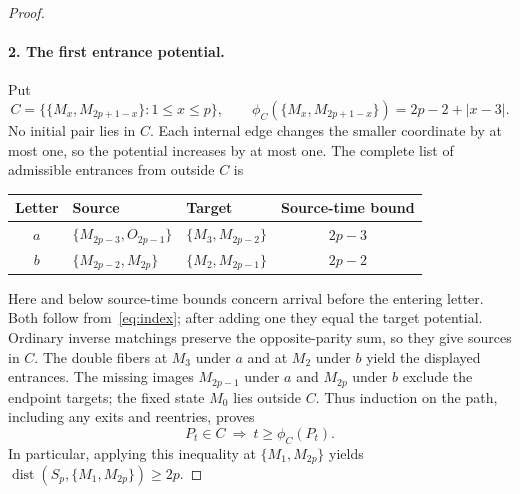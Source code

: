\documentclass[11pt]{article}
\newcommand{\dist}{\operatorname{dist}}
\newcommand{\M}[1]{M_{#1}}
\newcommand{\Ost}[1]{O_{#1}}
\newcommand{\pair}[2]{\{#1,#2\}}
\begin{document}
\begin{proof}
\paragraph{2. The first entrance potential.}
Put
\[
 C=\{\pair{\M x}{\M{2p+1-x}}:1\leq x\leq p\},
 \qquad \phi_C(\pair{\M x}{\M{2p+1-x}})=2p-2+|x-3|.
\]
No initial pair lies in $C$. Each internal edge changes the smaller coordinate by at most one, so the potential increases by at most one. The complete list of admissible entrances from outside $C$ is
\par\medskip
\begin{center}\small
\renewcommand{\arraystretch}{1.15}%
\begin{tabular}{@{}cllc@{}}\toprule
Letter & Source & Target & Source-time bound\\\midrule
$a$ & $\pair{\M{2p-3}}{\Ost{2p-1}}$ & $\pair{\M3}{\M{2p-2}}$ & $2p-3$\\
$b$ & $\pair{\M{2p-2}}{\M{2p}}$ & $\pair{\M2}{\M{2p-1}}$ & $2p-2$\\\bottomrule
\end{tabular}
\end{center}
\medskip
Here and below source-time bounds concern arrival before the entering letter. Both follow from~\eqref{eq:index}; after adding one they equal the target potential. Ordinary inverse matchings preserve the opposite-parity sum, so they give sources in $C$. The double fibers at $\M3$ under $a$ and at $\M2$ under $b$ yield the displayed entrances. The missing images $\M{2p-1}$ under $a$ and $\M{2p}$ under $b$ exclude the endpoint targets; the fixed state $\M0$ lies outside $C$. Thus induction on the path, including any exits and reentries, proves
\begin{equation}\label{eq:C}
 P_t\in C\ \Longrightarrow\ t\geq\phi_C(P_t).
\end{equation}
In particular, applying this inequality at $\pair{\M1}{\M{2p}}$ yields
$\dist(S_p,\pair{\M1}{\M{2p}})\geq2p$.


\end{proof}
\end{document}
